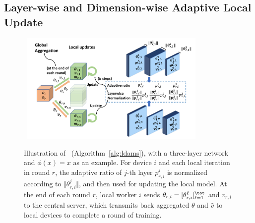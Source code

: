 \documentclass[manuscript,screen,review]{acmart}
\begin{document}
\subsection{Layer-wise and Dimension-wise Adaptive Local Update}

\begin{figure}[b!]
\vspace{0.1in}
\centering
\mbox{
        \includegraphics[width=0.8\textwidth]{new_figure/plot1.pdf}
}
\vspace{0.1in}
	\caption{Illustration of \algo\ (Algorithm~\ref{alg:ldams}), with a three-layer network and $\phi(x)=x$ as an example. %
		For device $i$ and each local iteration in round $r$, the adaptive ratio of $j$-th layer $p_{r,i}^j$ is normalized according to $\Vert \theta_{r,i}^j\Vert$, and then used for updating the local model. 
	At the end of each round $r$, local worker $i$ sends $\theta_{r,i} =  [\theta_{r,i}^{\ell}]_{\ell =1}^{\tot}$ and $v_{r,i}$ to the central server, which transmits back aggregated $\theta$ and $\hat v$ to local devices to complete a round of training.}
	\label{fig:illustrate}
\end{figure}
\end{document}
